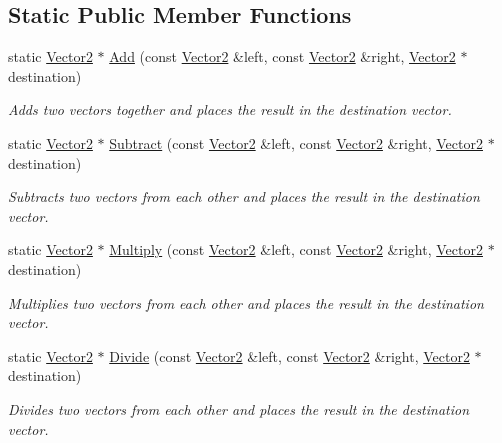 \subsection*{Static Public Member Functions}
\begin{DoxyCompactItemize}
\item 
static \hyperlink{class_flounder_1_1_vector2}{Vector2} $\ast$ \hyperlink{class_flounder_1_1_vector2_ac557b2f71b59d1f03caf6312f8bf58bd}{Add} (const \hyperlink{class_flounder_1_1_vector2}{Vector2} \&left, const \hyperlink{class_flounder_1_1_vector2}{Vector2} \&right, \hyperlink{class_flounder_1_1_vector2}{Vector2} $\ast$destination)
\begin{DoxyCompactList}\small\item\em Adds two vectors together and places the result in the destination vector. \end{DoxyCompactList}\item 
static \hyperlink{class_flounder_1_1_vector2}{Vector2} $\ast$ \hyperlink{class_flounder_1_1_vector2_a87d6a6539da815fe9a3ccfd7514bbe0d}{Subtract} (const \hyperlink{class_flounder_1_1_vector2}{Vector2} \&left, const \hyperlink{class_flounder_1_1_vector2}{Vector2} \&right, \hyperlink{class_flounder_1_1_vector2}{Vector2} $\ast$destination)
\begin{DoxyCompactList}\small\item\em Subtracts two vectors from each other and places the result in the destination vector. \end{DoxyCompactList}\item 
static \hyperlink{class_flounder_1_1_vector2}{Vector2} $\ast$ \hyperlink{class_flounder_1_1_vector2_ac4905907f3315ced1738be0bfd3e6477}{Multiply} (const \hyperlink{class_flounder_1_1_vector2}{Vector2} \&left, const \hyperlink{class_flounder_1_1_vector2}{Vector2} \&right, \hyperlink{class_flounder_1_1_vector2}{Vector2} $\ast$destination)
\begin{DoxyCompactList}\small\item\em Multiplies two vectors from each other and places the result in the destination vector. \end{DoxyCompactList}\item 
static \hyperlink{class_flounder_1_1_vector2}{Vector2} $\ast$ \hyperlink{class_flounder_1_1_vector2_a2b49e5d36a1433166fdea064a5fc0ff5}{Divide} (const \hyperlink{class_flounder_1_1_vector2}{Vector2} \&left, const \hyperlink{class_flounder_1_1_vector2}{Vector2} \&right, \hyperlink{class_flounder_1_1_vector2}{Vector2} $\ast$destination)
\begin{DoxyCompactList}\small\item\em Divides two vectors from each other and places the result in the destination vector. \end{DoxyCompactList}\item 

\end{DoxyCompactItemize}
